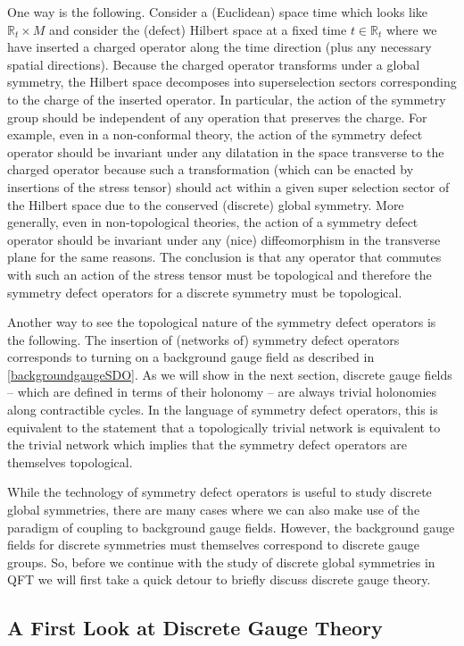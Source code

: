 \documentclass[11pt]{article}
\def\IR{{\mathbb{R}}}
\begin{document}
One way is the following.  Consider a (Euclidean) space time which looks like $\IR_t\times M$ and consider the (defect) Hilbert space at a fixed time $t\in \IR_t$ where we have inserted a charged operator along the time direction (plus any necessary spatial directions). Because the charged operator transforms under a global symmetry, the Hilbert space decomposes into superselection sectors corresponding to the charge of the inserted operator. In particular, the action of the symmetry group should be independent of any operation that preserves the charge. For example, even in a non-conformal theory, the action of the symmetry defect operator should be invariant under any dilatation in the space transverse to the charged operator because such a transformation (which can be enacted by insertions of the stress tensor) should act within a given super selection sector of the Hilbert space due to the conserved (discrete) global symmetry. 
 More generally, 
even in non-topological theories, the action of a symmetry defect operator should be invariant under any (nice) diffeomorphism in the transverse plane for the same reasons. The conclusion is that any operator that commutes with such an action of the stress tensor must be topological and therefore the symmetry defect operators for a discrete symmetry must be topological. 

Another way to see the topological nature of the symmetry defect operators is the following. The insertion of (networks of) symmetry defect operators corresponds to turning on a background gauge field as described in \eqref{backgroundgaugeSDO}. As we will show in the next section, discrete gauge fields -- which are defined in terms of their holonomy -- are always trivial holonomies along contractible cycles. In the language of symmetry defect operators, this is equivalent to the statement that a topologically trivial network is equivalent to the trivial network which implies that the symmetry defect operators are themselves topological. 

\bigskip While the technology of symmetry defect operators is useful to study discrete global symmetries, there are many cases where we can also make use of the paradigm of coupling to background gauge fields. 
However, the background gauge fields for discrete symmetries must themselves correspond to discrete gauge groups. So, before we continue with the study of discrete global symmetries in QFT we will first take a quick detour to briefly discuss  discrete gauge theory. 


\subsection{A First Look at Discrete Gauge Theory}
\end{document}
